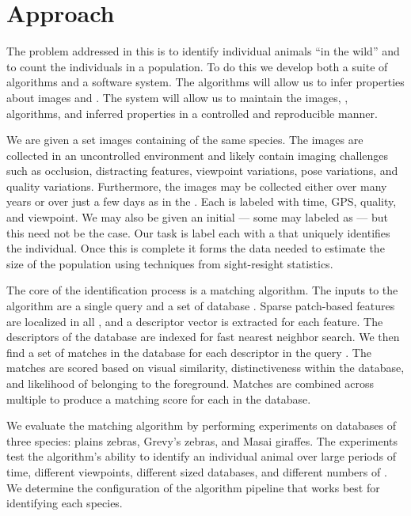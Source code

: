         \RankFigure{}

\section{Approach}
    The problem addressed in this \thesis{} is to identify individual animals
      ``in the wild'' and to count the individuals in a population.
    To do this we develop both a suite of algorithms and a software system.
    The algorithms will allow us to infer properties about images and
      \annots{}.
    The system will allow us to maintain the images, \annots{}, algorithms,
      and inferred properties in a controlled and reproducible manner.

    We are given a set images containing \annots{} of the same species.
    The images are collected in an uncontrolled environment and likely contain
      imaging challenges such as occlusion, distracting features, viewpoint
      variations, pose variations, and quality variations.
    Furthermore, the images may be collected either over many years or over
      just a few days as in the \GZC{}.
    Each \annot{} is labeled with time, GPS, quality, and viewpoint.
    We may also be given an initial \masterdatabase{} --- \ie{} some \annots{}
      may labeled as \exemplars{} --- but this need not be the case.
    Our task is label each \annot{} with a \glossterm{\name{}} that uniquely
      identifies the individual.
    Once this is complete it forms the data needed to estimate the size of the
      population using techniques from sight-resight statistics.

    The core of the identification process is a matching algorithm.
    The inputs to the algorithm are a single query \annot{} and a set of
      database \annots{}.
    Sparse patch-based features are localized in all \annots{}, and a
      descriptor vector is extracted for each feature.
    The descriptors of the database \annots{} are indexed for fast nearest
      neighbor search.
    We then find a set of matches in the database for each descriptor in the
      query \annot{}.
    The matches are scored based on visual similarity, distinctiveness within
      the database, and likelihood of belonging to the foreground.
    Matches are combined across multiple \exemplar{} \annots{} to produce a
      matching score for each \mastername{} in the database.

    We evaluate the matching algorithm by performing experiments on databases
      of three species:
    plains zebras, Grevy's zebras, and Masai giraffes.
    The experiments test the algorithm's ability to identify an individual
      animal over large periods of time, different viewpoints, different sized
      databases, and different numbers of \exemplars{}.
    We determine the configuration of the algorithm pipeline that works best
      for identifying each species.


